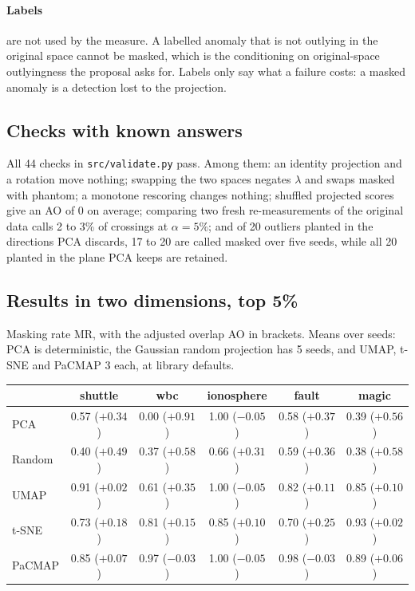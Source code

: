 \paragraph{Labels} are not used by the measure. A labelled anomaly that is
not outlying in the original space cannot be masked, which is the
conditioning on original-space outlyingness the proposal asks for. Labels
only say what a failure costs: a masked anomaly is a detection lost to the
projection.

\subsection*{Checks with known answers}

All 44 checks in \texttt{src/validate.py} pass. Among them: an identity
projection and a rotation move nothing; swapping the two spaces negates
$\lambda$ and swaps masked with phantom; a monotone rescoring changes
nothing; shuffled projected scores give an AO of 0 on average; comparing two
fresh re-measurements of the original data calls 2 to 3\% of crossings at
$\alpha = 5\%$; and of 20 outliers planted in the directions PCA discards,
17 to 20 are called masked over five seeds, while all 20 planted in the
plane PCA keeps are retained.

\subsection*{Results in two dimensions, top 5\%}

Masking rate MR, with the adjusted overlap AO in brackets. Means over
seeds: PCA is deterministic, the Gaussian random projection has 5
seeds, and UMAP, t-SNE and PaCMAP 3 each, at library defaults.
\begin{center}
\small
\begin{tabular}{lccccc}
\hline
 & shuttle & wbc & ionosphere & fault & magic \\
\hline
PCA & 0.57 ($+0.34$) & 0.00 ($+0.91$) & 1.00 ($-0.05$) & 0.58 ($+0.37$) & 0.39 ($+0.56$) \\
Random & 0.40 ($+0.49$) & 0.37 ($+0.58$) & 0.66 ($+0.31$) & 0.59 ($+0.36$) & 0.38 ($+0.58$) \\
UMAP & 0.91 ($+0.02$) & 0.61 ($+0.35$) & 1.00 ($-0.05$) & 0.82 ($+0.11$) & 0.85 ($+0.10$) \\
t-SNE & 0.73 ($+0.18$) & 0.81 ($+0.15$) & 0.85 ($+0.10$) & 0.70 ($+0.25$) & 0.93 ($+0.02$) \\
PaCMAP & 0.85 ($+0.07$) & 0.97 ($-0.03$) & 1.00 ($-0.05$) & 0.98 ($-0.03$) & 0.89 ($+0.06$) \\
\hline
\end{tabular}
\end{center}

